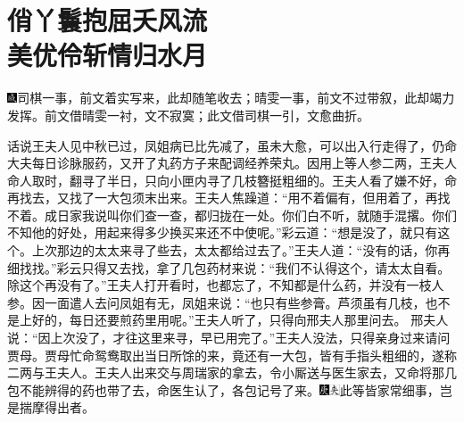 
\chapter{俏丫鬟抱屈夭风流\\美优伶斩情归水月}

{\includegraphics[width=3mm]{../Images/00005}\kaishu 司棋一事，前文着实写来，此却随笔收去；晴雯一事，前文不过带叙，此却竭力发挥。前文借晴雯一衬，文不寂寞；此文借司棋一引，文愈曲折。}

话说王夫人见中秋已过，凤姐病已比先减了，虽未大愈，可以出入行走得了，仍命大夫每日诊脉服药，又开了丸药方子来配调经养荣丸。因用上等人参二两，王夫人命人取时，翻寻了半日，只向小匣内寻了几枝簪挺粗细的。王夫人看了嫌不好，命再找去，又找了一大包须末出来。王夫人焦躁道：``用不着偏有，但用着了，再找不着。成日家我说叫你们查一查，都归拢在一处。你们白不听，就随手混撂。你们不知他的好处，用起来得多少换买来还不中使呢。''彩云道：``想是没了，就只有这个。上次那边的太太来寻了些去，太太都给过去了。''王夫人道：``没有的话，你再细找找。''彩云只得又去找，拿了几包药材来说：``我们不认得这个，请太太自看。除这个再没有了。''王夫人打开看时，也都忘了，不知都是什么药，并没有一枝人参。因一面遣人去问凤姐有无，凤姐来说：``也只有些参膏。芦须虽有几枝，也不是上好的，每日还要煎药里用呢。''王夫人听了，只得向邢夫人那里问去。
邢夫人说：``因上次没了，才往这里来寻，早已用完了。''王夫人没法，只得亲身过来请问贾母。贾母忙命鸳鸯取出当日所馀的来，竟还有一大包，皆有手指头粗细的，遂称二两与王夫人。王夫人出来交与周瑞家的拿去，令小厮送与医生家去，又命将那几包不能辨得的药也带了去，命医生认了，各包记号了来。{\includegraphics[width=3mm]{../Images/00004}\includegraphics[width=3mm]{../Images/00012}\footnotesize \kaishu 此等皆家常细事，岂是揣摩得出者。}

